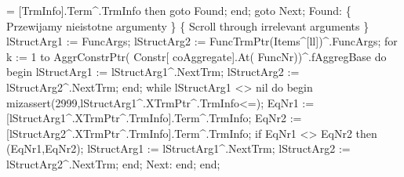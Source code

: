                      = [TrmInfo].Term^.TrmInfo then goto Found;
               end;
               goto Next;
               Found:
                  \{ Przewijamy nieistotne argumenty \}
                  \{ Scroll through irrelevant arguments \}
                  lStructArg1 := FuncArgs;
               lStructArg2 := FuncTrmPtr(Items^[ll])^.FuncArgs;
               for k := 1 to AggrConstrPtr( Constr[ coAggregate].At( FuncNr))^.fAggregBase do
               begin
                  lStructArg1 := lStructArg1^.NextTrm;
                  lStructArg2 := lStructArg2^.NextTrm;
               end;
               while lStructArg1 <> nil do
               begin
                  mizassert(2999,lStructArg1^.XTrmPtr^.TrmInfo<=);
                  EqNr1 := [lStructArg1^.XTrmPtr^.TrmInfo].Term^.TrmInfo;
                  EqNr2 := [lStructArg2^.XTrmPtr^.TrmInfo].Term^.TrmInfo;
                  if EqNr1 <> EqNr2 then (EqNr1,EqNr2);
                  lStructArg1 := lStructArg1^.NextTrm; lStructArg2 := lStructArg2^.NextTrm;
               end;
               Next:
            end;
      end;
      
